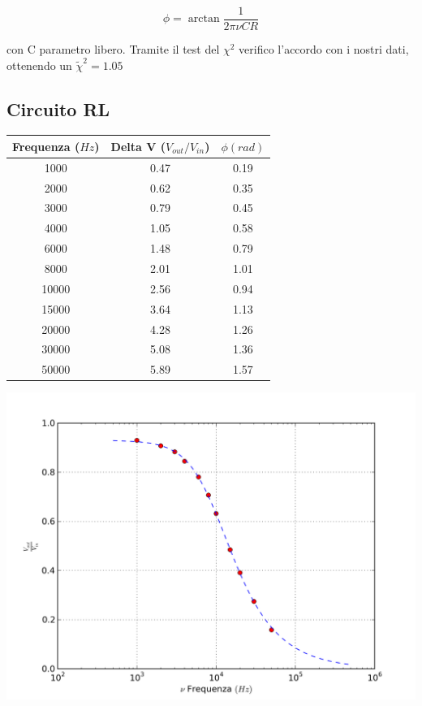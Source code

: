 $$ \phi = \arctan \frac{1}{2\pi\nu C R} $$

con C parametro libero. Tramite il test del $\chi^2$ verifico l'accordo con i nostri dati, ottenendo un $\tilde{\chi}^2 = 1.05$

\subsection{Circuito RL}
\begin{center}

\begin{tabular}{*{3}{c}}
Frequenza ($Hz$) & Delta V ($V_{out}/V_{in}$) & $\phi (rad)$ \\
\midrule
1000& 0.47 & 0.19 \\
2000 & 0.62 & 0.35\\
3000 & 0.79 & 0.45\\
4000 & 1.05 & 0.58\\
6000 & 1.48 & 0.79\\
8000 & 2.01 & 1.01\\
10000 & 2.56 & 0.94\\
15000 & 3.64 & 1.13\\
20000 & 4.28 & 1.26\\
30000 & 5.08 & 1.36\\
50000 & 5.89 & 1.57\\
\end{tabular}
\end{center}


\begin{center}
 \includegraphics[scale=0.70]{grafici/C3/ddpindu.png}
\end{center}

